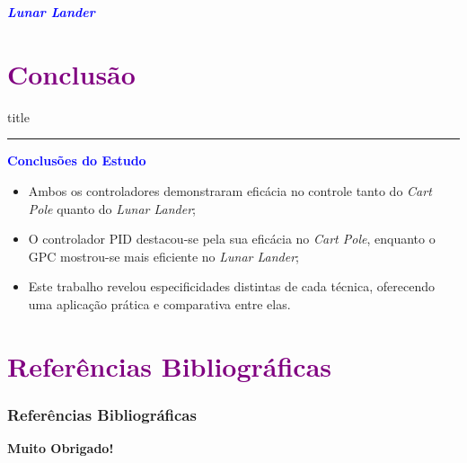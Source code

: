 \documentclass[aspectratio=169]{beamer}
\begin{document}
\begin{frame}{\textcolor{blue}{\textbf{\textit{Lunar Lander}}}}
\end{frame}

\section{\textbf{\textcolor{purple}{Conclusão}}}
    \begin{frame}[plain]
        \vfill
      \centering
      \begin{beamercolorbox}[sep=8pt,center,shadow=true,rounded=true]{title}
        \insertsectionhead\par%
        \color{oxfordblue}\noindent\rule{10cm}{1pt}
      \end{beamercolorbox}
      \vfill
  \end{frame}


\begin{frame}{\textcolor{blue}{\textbf{Conclusões do Estudo}}}
\begin{itemize}
    \justifying 
    \item[\textcolor{blue}{\checkmark}]   Ambos os controladores demonstraram eficácia no controle tanto do \textit{Cart Pole} quanto do \textit{Lunar Lander};
    \item[\textcolor{blue}{\checkmark}]  O controlador PID destacou-se pela sua eficácia no \textit{Cart Pole}, enquanto o GPC mostrou-se mais eficiente no \textit{Lunar Lander};
    \item[\textcolor{blue}{\checkmark}] Este trabalho revelou especificidades distintas de cada técnica, oferecendo uma aplicação prática e comparativa entre elas.
\end{itemize}
\end{frame}




\section{\textbf{\textcolor{purple}{Referências Bibliográficas}}}
\begin{frame}[allowframebreaks]
  \frametitle{Referências Bibliográficas}
  
  
  \nocite{*}
\end{frame}


\begin{frame}{}
    \begin{center}
        \vspace{10mm}
        \textbf{\textcolor{teal!80}{\huge Muito Obrigado!}}
    \end{center}
\end{frame}
\end{document}
